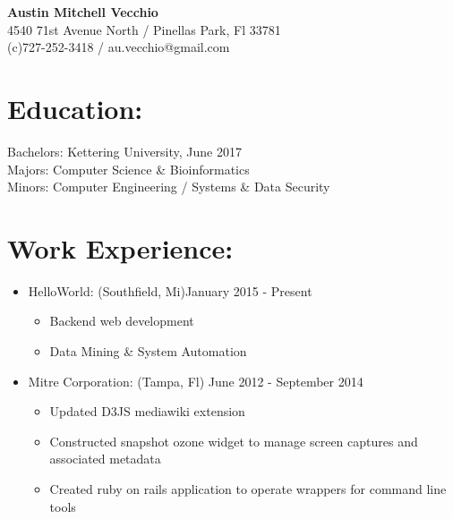 \documentclass{res}
\begin{document}
\begin{center}
\LARGE{\textbf{Austin Mitchell Vecchio}}\\
\normalsize{
4540 71st Avenue North / Pinellas Park, Fl 33781\\
(c)727-252-3418 / au.vecchio@gmail.com
}
\end{center}

\section{Education:}

Bachelors: Kettering University, June 2017\\
Majors: Computer Science \& Bioinformatics\\
Minors: Computer Engineering / Systems \& Data Security\\

\section{Work Experience:}
\begin{itemize}[leftmargin=*]
\item HelloWorld: (Southfield, Mi)\hfill January 2015 - Present
\begin{itemize}[label=$\circ$]
\item Backend web development
\item Data Mining \& System Automation
\end{itemize}
\item Mitre Corporation: (Tampa, Fl) \hfill June 2012 - September 2014
\begin{itemize}[label=$\circ$]
\item Updated D3JS mediawiki extension
\item Constructed snapshot ozone widget to manage screen captures and associated metadata
\item Created ruby on rails application to operate wrappers for command line tools
\end{itemize}
\end{itemize}
\end{document}
